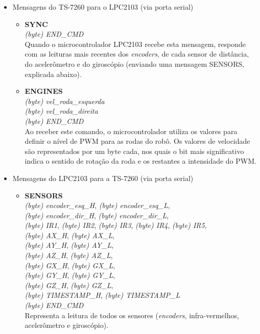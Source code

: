 \begin{itemize}
  \item Mensagens do TS-7260 para o LPC2103 (via porta serial)
  
	\begin{itemize}
		
	  \item \textbf{SYNC}\\
	  \textit{(byte) END\_CMD}\\
	  Quando o microcontrolador LPC2103 recebe esta mensagem, responde com as leituras mais recentes dos \textit{encoders}, de cada sensor de distância, do acelerômetro e do giroscópio (enviando uma mensagem SENSORS, explicada abaixo).
	  
	  \item \textbf{ENGINES}\\
	  \textit{(byte) vel\_roda\_esquerda}\\
	  \textit{(byte) vel\_roda\_direita}\\
	  \textit{(byte) END\_CMD}\\
	  Ao receber este comando, o microcontrolador utiliza os valores para definir o nível de PWM para as rodas do robô. Os valores de velocidade são representados por um byte cada, nos quais o bit mais significativo indica o sentido de rotação da roda e os restantes a intensidade do PWM.
	  
	  \end{itemize}
	  
	  \item Mensagens do LPC2103 para a TS-7260 (via porta serial)
	  
	  \begin{itemize}
	  
	  \item \textbf{SENSORS}\\
	  \textit{(byte) encoder\_esq\_H}, \textit{(byte) encoder\_esq\_L},\\
	  \textit{(byte) encoder\_dir\_H}, \textit{(byte) encoder\_dir\_L},\\
	  \textit{(byte) IR1}, \textit{(byte) IR2}, \textit{(byte) IR3}, \textit{(byte) IR4}, \textit{(byte) IR5},\\
	  \textit{(byte) AX\_H}, \textit{(byte) AX\_L},\\
	  \textit{(byte) AY\_H}, \textit{(byte) AY\_L},\\
	  \textit{(byte) AZ\_H}, \textit{(byte) AZ\_L},\\
	  \textit{(byte) GX\_H}, \textit{(byte) GX\_L},\\
	  \textit{(byte) GY\_H}, \textit{(byte) GY\_L},\\
	  \textit{(byte) GZ\_H}, \textit{(byte) GZ\_L},\\
	  \textit{(byte) TIMESTAMP\_H}, \textit{(byte) TIMESTAMP\_L}\\
	  \textit{(byte) END\_CMD}\\
	  Representa a leitura de todos os sensores (\textit{encoders}, infra-vermelhos, acelerômetro e giroscópio). 
	  

\end{itemize}
\end{itemize}
